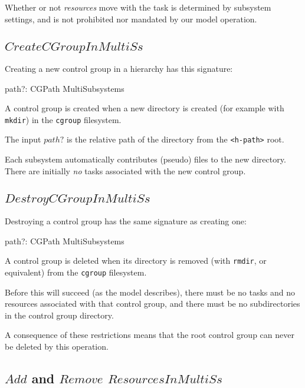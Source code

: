 \documentclass[a4paper,twoside,12pt]{article}
\begin{document}
Whether or not \emph{resources} move with the task is determined by subsystem settings, and is not
prohibited nor mandated by our model operation.

\subsection{$CreateCGroupInMultiSs$}

Creating a new control group in a hierarchy has this signature:
\begin{schema*}
    path?: CGPath
\also 
    \Delta MultiSubsystems
\end{schema*}
A control group is created when a new directory is created (for example with \texttt{mkdir}) 
in the \texttt{cgroup} filesystem.

The input $path?$ is the relative path of the directory from the \texttt{<h-path>} root.

Each subsystem automatically contributes
(pseudo) files to the new directory. There are initially \emph{no} tasks associated with the new control group.

\subsection{$DestroyCGroupInMultiSs$}

Destroying a control group has the same signature as creating one:
\begin{schema*}
    path?: CGPath
\also 
    \Delta MultiSubsystems
\end{schema*}
A control group is deleted when its directory is removed (with \texttt{rmdir}, or equivalent) from the 
\texttt{cgroup} filesystem.

Before this will succeed (as the model describes), there must be no tasks and no resources 
associated with that control group,
and there must be no subdirectories in the control group directory.

A consequence of these restrictions means that the root control group can never be deleted by this operation.

\subsection{$Add$ and $Remove$ $ResourcesInMultiSs$}
\end{document}
